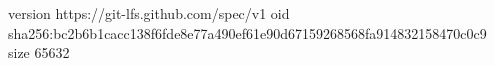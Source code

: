 version https://git-lfs.github.com/spec/v1
oid sha256:bc2b6b1cacc138f6fde8e77a490ef61e90d67159268568fa914832158470c0c9
size 65632
